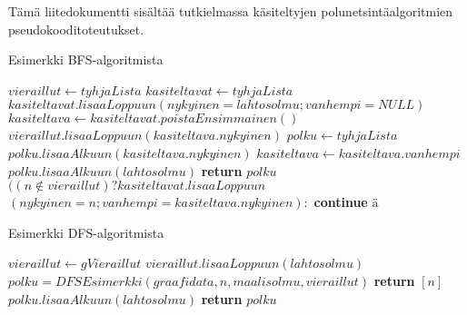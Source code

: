 Tämä liitedokumentti sisältää tutkielmassa käsiteltyjen 
polunetsintäalgoritmien pseudokooditoteutukset.

\begin{algorithm}
\caption{Esimerkki BFS-algoritmista}\label{BFSEsim}
\begin{algoritmic}
	\State $vieraillut \gets tyhjaLista$
	\State $kasiteltavat \gets tyhjaLista$
	\State $kasiteltavat.lisaaLoppuun(nykyinen=lahtosolmu;vanhempi=NULL)$
		\State $kasiteltava \gets kasiteltavat.poistaEnsimmainen()$
		\State $vieraillut.lisaaLoppuun(kasiteltava.nykyinen)$
			\State $polku \gets tyhjaLista$
				\State $polku.lisaaAlkuun(kasiteltava.nykyinen)$
				\State $kasiteltava \gets kasiteltava.vanhempi$
			\EndWhile
			\State $polku.lisaaAlkuun(lahtosolmu)$
			\State \textbf{return} $polku$
		\Else
				\State $((n \not\in vieraillut) ?  kasiteltavat.lisaaLoppuun$
				\State $(nykyinen = n;vanhempi = kasiteltava.nykyinen) :$
				\State \textbf{continue} $ä$
			\EndFor
		\EndIf
	\EndWhile
\EndProcedure
\end{algoritmic}
\end{algorithm}

\begin{algorithm}
\caption{Esimerkki DFS-algoritmista}\label{DFSEsim}
\begin{algorithmic}
	\State $vieraillut \gets gVieraillut$
	\State $vieraillut.lisaaLoppuun(lahtosolmu)$
				\State $polku = DFSEsimerkki(graafidata,n,maalisolmu,vieraillut)$
			\Else
				\State \textbf{return} $[n]$
			\EndIf
		\EndIf
	\EndFor
		\State $polku.lisaaAlkuun(lahtosolmu)$
	\EndIf
	\State \textbf{return} $polku$
\EndProcedure
\end{algorithmic}
\end{algorithm}

